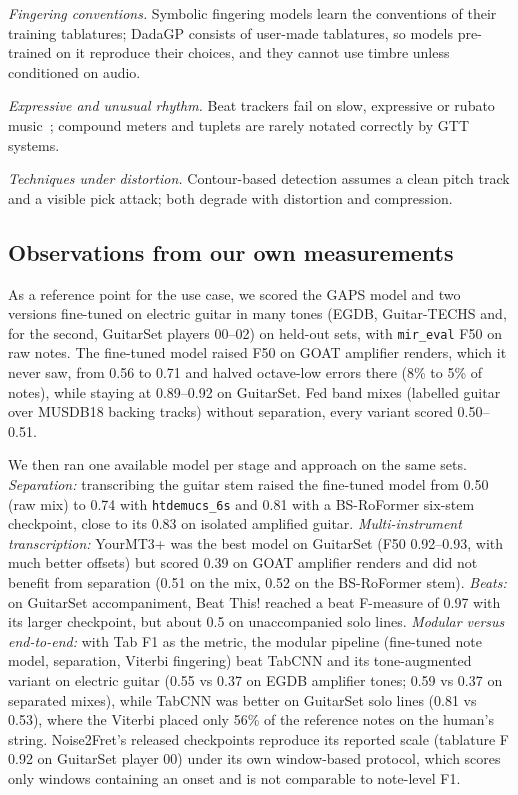 \emph{Fingering conventions.} Symbolic fingering models learn the conventions
of their training tablatures; DadaGP consists of user-made tablatures, so
models pre-trained on it reproduce their choices, and they cannot use
timbre unless conditioned on audio.

\emph{Expressive and unusual rhythm.} Beat trackers fail on slow, expressive
or rubato music~\cite{ahn2026smc}; compound meters and tuplets are rarely
notated correctly by GTT systems.

\emph{Techniques under distortion.} Contour-based detection assumes a clean
pitch track and a visible pick attack; both degrade with distortion and
compression.

\subsection{Observations from our own measurements}
As a reference point for the use case, we scored the GAPS model and two
versions fine-tuned on electric guitar in many tones (EGDB, Guitar-TECHS and,
for the second, GuitarSet players 00--02) on held-out sets, with
\texttt{mir\_eval} F50 on raw notes. The fine-tuned model raised F50 on
GOAT amplifier renders, which it never saw, from 0.56 to 0.71 and halved
octave-low errors there (8\% to 5\% of notes), while staying at 0.89--0.92 on
GuitarSet. Fed band mixes (labelled guitar over MUSDB18 backing tracks)
without separation, every variant scored 0.50--0.51.

We then ran one available model per stage and approach on the same sets.
\emph{Separation:} transcribing the guitar stem raised the fine-tuned model
from 0.50 (raw mix) to 0.74 with \texttt{htdemucs\_6s} and 0.81 with a
BS-RoFormer six-stem checkpoint, close to its 0.83 on isolated amplified
guitar. \emph{Multi-instrument transcription:} YourMT3+ was the best model on
GuitarSet (F50 0.92--0.93, with much better offsets) but scored 0.39 on GOAT
amplifier renders and did not benefit from separation (0.51 on the mix, 0.52
on the BS-RoFormer stem). \emph{Beats:} on GuitarSet accompaniment, Beat This!
reached a beat F-measure of 0.97 with its larger checkpoint, but about 0.5 on
unaccompanied solo lines. \emph{Modular versus end-to-end:} with Tab F1 as the
metric, the modular pipeline (fine-tuned note model, separation, Viterbi
fingering) beat TabCNN and its tone-augmented variant on electric guitar
(0.55 vs 0.37 on EGDB amplifier tones; 0.59 vs 0.37 on separated mixes), while
TabCNN was better on GuitarSet solo lines (0.81 vs 0.53), where the Viterbi
placed only 56\% of the reference notes on the human's string. Noise2Fret's
released checkpoints reproduce its reported scale (tablature F 0.92 on
GuitarSet player 00) under its own window-based protocol, which scores only
windows containing an onset and is not comparable to note-level F1.

